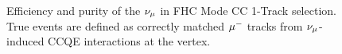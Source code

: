 \begin{figure}
\begin{centering}
\par\end{centering}
\caption[Efficiency and Purity of the $\numu$ in FHC Mode CC 1-Track Selection]{Efficiency and purity of the $\protect\nu_{\mu}$ in FHC Mode CC 1-Track
selection. True events are defined as correctly matched $\protect\mu^{-}$
tracks from $\protect\nu_{\mu}$-induced CCQE interactions at the vertex.
\label{fig:numuFHCCC1TrkRecoEffPur}}
\end{figure}

